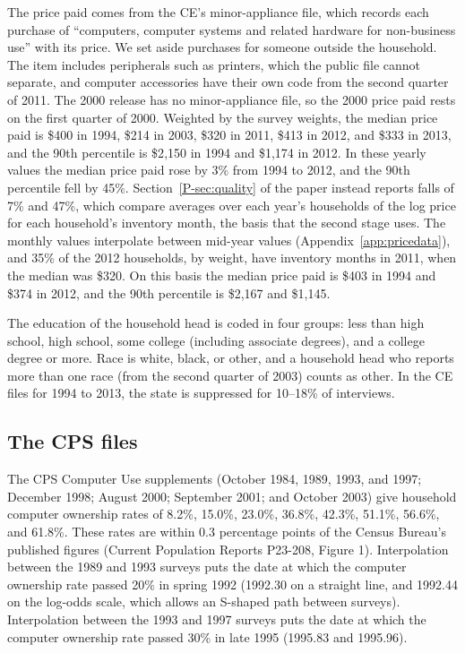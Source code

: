 \documentclass[11pt]{article}
\begin{document}
The price paid comes from the CE's minor-appliance file, which records each purchase of ``computers, computer systems and related hardware for non-business use'' with its price. We set aside purchases for someone outside the household. The item includes peripherals such as printers, which the public file cannot separate, and computer accessories have their own code from the second quarter of 2011. The 2000 release has no minor-appliance file, so the 2000 price paid rests on the first quarter of 2000. Weighted by the survey weights, the median price paid is \$400 in 1994, \$214 in 2003, \$320 in 2011, \$413 in 2012, and \$333 in 2013, and the 90th percentile is \$2{,}150 in 1994 and \$1{,}174 in 2012. In these yearly values the median price paid rose by 3\% from 1994 to 2012, and the 90th percentile fell by 45\%. Section~\ref{P-sec:quality} of the paper instead reports falls of 7\% and 47\%, which compare averages over each year's households of the log price for each household's inventory month, the basis that the second stage uses. The monthly values interpolate between mid-year values (Appendix~\ref{app:pricedata}), and 35\% of the 2012 households, by weight, have inventory months in 2011, when the median was \$320. On this basis the median price paid is \$403 in 1994 and \$374 in 2012, and the 90th percentile is \$2{,}167 and \$1{,}145.

The education of the household head is coded in four groups: less than high school, high school, some college (including associate degrees), and a college degree or more. Race is white, black, or other, and a household head who reports more than one race (from the second quarter of 2003) counts as other. In the CE files for 1994 to 2013, the state is suppressed for 10--18\% of interviews.

\subsection{The CPS files}
\label{app:cpsfiles}

The CPS Computer Use supplements (October 1984, 1989, 1993, and 1997; December 1998; August 2000; September 2001; and October 2003) give household computer ownership rates of 8.2\%, 15.0\%, 23.0\%, 36.8\%, 42.3\%, 51.1\%, 56.6\%, and 61.8\%. These rates are within 0.3 percentage points of the Census Bureau's published figures (Current Population Reports P23-208, Figure 1). Interpolation between the 1989 and 1993 surveys puts the date at which the computer ownership rate passed 20\% in spring 1992 (1992.30 on a straight line, and 1992.44 on the log-odds scale, which allows an S-shaped path between surveys). Interpolation between the 1993 and 1997 surveys puts the date at which the computer ownership rate passed 30\% in late 1995 (1995.83 and 1995.96).
\end{document}
